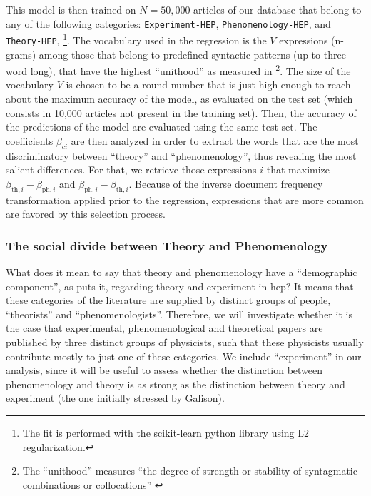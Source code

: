 \documentclass[smallextended]{svjour3}
\begin{document}
This model is then trained on $N=50,000$ articles of our database that belong to any of the following categories: \texttt{Experiment-HEP}, \texttt{Phenomenology-HEP}, and \texttt{Theory-HEP}, \footnote{The fit is performed with the scikit-learn python library \citep{scikit-learn} using L2 regularization.}. The vocabulary used in the regression is the $V$ expressions (n-grams) among those that belong to predefined syntactic patterns (up to three word long), that have the highest ``unithood'' as measured in \citealt{omodei_tel-01097702}\footnote{The ``unithood'' measures ``the degree of strength or stability of syntagmatic combinations or collocations'' \citep{Kageura1996}}. The size of the vocabulary $V$ is chosen to be a round number that is just high enough to reach about the maximum accuracy of the model, as evaluated on the test set (which consists in 10,000 articles not present in the training set). Then, the accuracy of the predictions of the model are evaluated using the same test set. The coefficients $\beta_{ci}$ are then analyzed in order to extract the words that are the most discriminatory between ``theory'' and ``phenomenology'', thus revealing the most salient differences. For that, we retrieve those expressions $i$ that maximize $\beta_{\text{th},i}-\beta_{\text{ph},i}$ and $\beta_{\text{ph},i}-\beta_{\text{th},i}$. Because of the inverse document frequency transformation applied prior to the regression, expressions that are more common are favored by this selection process.

\subsubsection{The social divide between Theory and Phenomenology}

What does it mean to say that theory and phenomenology have a ``demographic component'', as  \citet[p.~138]{galison1987how} puts it, regarding theory and experiment in \gls{hep}? It means that these categories of the literature are supplied by distinct groups of people, ``theorists'' and ``phenomenologists''. Therefore, we will investigate whether it is the case that experimental, phenomenological and theoretical papers are published by three distinct groups of physicists, such that these physicists usually contribute mostly to just one of these categories. We include ``experiment'' in our analysis, since it will be useful to assess whether the distinction between phenomenology and theory is as strong as the distinction between theory and experiment (the one initially stressed by Galison).
\end{document}

